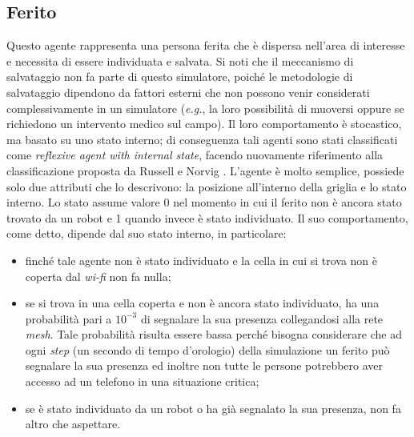 \subsection{Ferito}
\label{subsec:Ferito}
Questo agente rappresenta una persona ferita che è dispersa nell'area di interesse e necessita di essere individuata e salvata. Si noti che il meccanismo di salvataggio non fa parte di questo simulatore, poiché le metodologie di salvataggio dipendono da fattori esterni che non possono venir considerati complessivamente in un simulatore (\textit{e.g.}, la loro possibilità di muoversi oppure se richiedono un intervento medico sul campo).
Il loro comportamento è stocastico, ma basato su uno stato interno; di conseguenza tali agenti sono stati classificati come \textit{reflexive agent with internal state}, facendo nuovamente riferimento alla classificazione proposta da Russell e Norvig \cite{russell2016}.
L'agente è molto semplice, possiede solo due attributi che lo descrivono: la posizione all'interno della griglia e lo stato interno. Lo stato assume valore 0 nel momento in cui il ferito non è ancora stato trovato da un robot e 1 quando invece è stato individuato.
Il suo comportamento, come detto, dipende dal suo stato interno, in particolare: 
\begin{itemize}
	\item finché tale agente non è stato individuato e la cella in cui si trova non è coperta dal \textit{wi-fi} non fa nulla;
	\item se si trova in una cella coperta e non è ancora stato individuato, ha una probabilità pari a $10^{-3}$ di segnalare la sua presenza collegandosi alla rete \textit{mesh}. Tale probabilità risulta essere bassa perché bisogna considerare che ad ogni \textit{step} (un secondo di tempo d'orologio) della simulazione un ferito può segnalare la sua presenza ed inoltre non tutte le persone potrebbero aver accesso ad un telefono in una situazione critica;
	\item se è stato individuato da un robot o ha già segnalato la sua presenza, non fa altro che aspettare.
\end{itemize}

